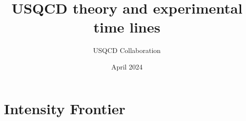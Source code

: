\documentclass[12pt,hyperpdf]{article}
\title{USQCD theory and experimental time lines}
\author{USQCD Collaboration}
\date{April 2024}
\begin{document}


\maketitle

\setcounter{page}{1}

\tableofcontents

\clearpage
\setcounter{page}{1}

\section{Intensity Frontier}\label{sec:intensity}

\end{document}

